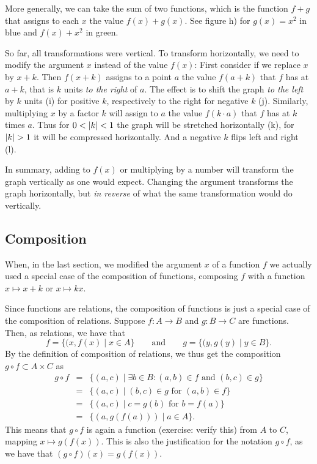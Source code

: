 More generally, we can take the sum of two functions, which is the function $f+g$ that
assigns to each $x$ the value $f(x)+g(x)$. See figure h) for $g(x)=x^2$ in blue and
$f(x)+x^2$ in green.
\medskip

So far, all transformations were vertical. To transform horizontally, we need to modify
the argument $x$ instead of the value $f(x)$:
First consider if we replace $x$ by $x+k$. Then $f(x+k)$ assigns to a point $a$ the
value $f(a+k)$ that $f$ has at $a+k$, that is $k$ units {\em to the right} of $a$.
The effect is to shift the
graph {\em to the left} by $k$ units (i) for positive $k$, respectively to the right for
negative $k$ (j).
Similarly, multiplying $x$ by a factor $k$ will assign to $a$ the value $f(k\cdot a)$
that $f$ has at $k$ times $a$. Thus for $0<\left|k\right|<1$ the graph will be stretched
horizontally (k), for $\sz{k}>1$ it will be compressed horizontally. And a negative $k$
flips left and right (l).
\medskip

In summary, adding to $f(x)$ or multiplying by a number will transform the graph
vertically as one would expect. Changing the argument transforms the graph horizontally,
but {\em in reverse} of what the same transformation would do vertically.

\subsection{Composition}
\label{secfunccomposition}

When, in the last section, we modified the argument $x$ of a function $f$ we actually
used a special case of the composition of functions, composing $f$ with a function
$x\mapsto x+k$ or $x\mapsto kx$.

Since functions are relations, the composition of functions is just a special case of
the composition of relations. Suppose $f\colon A\to B$ and $g\colon B\to C$ are
functions. Then, as relations, we have that 
\[
f=\{(x,f(x)\mid x\in A\}
\qquad\mbox{and}\qquad
g=\{(y,g(y)\mid y\in B\}.
\]
By the definition of composition of relations, we thus get the composition $g\circ
f\subset A\times C$ as
\begin{eqnarray*}
g\circ f&=&\{(a,c)\mid \exists b\in B:(a,b)\in f \mbox{\ and\ }(b,c)\in g\}\\
&=&\{(a,c)\mid (b,c)\in g \mbox{\ for\ }(a,b)\in f\}\\
&=&\{(a,c)\mid c=g(b) \mbox{\ for\ }b=f(a)\}\\
&=&\{(a,g(f(a)))\mid a\in A\}.
\end{eqnarray*}
This means that $g\circ f$ is again a function (exercise: verify this) from
$A$ to $C$, mapping $x\mapsto g(f(x))$. This is also the justification for the notation
$g\circ f$, as we have that $(g\circ f)(x)=g(f(x))$.
\smallskip

